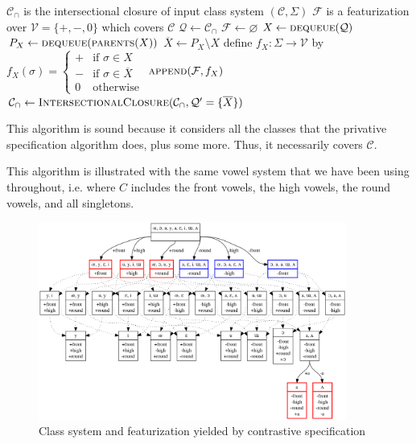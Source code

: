 \documentclass[11pt, oneside]{article}   	%
\begin{document}
\vspace{\baselineskip} \noindent \begin{algorithmic}
    \REQUIRE $\mathcal C_\cap$ is the intersectional closure of input class system $(\mathcal C, \Sigma)$
    \ENSURE $\mathcal F$ is a featurization over $\mathcal V = \{ +, -, 0 \}$ which covers $\mathcal C$
    \STATE
    \STATE $\mathcal Q \leftarrow \mathcal C_\cap$
    \STATE $\mathcal F \leftarrow \varnothing$
    \STATE
        \STATE $X \leftarrow \textsc{dequeue}(\mathcal Q)$
            \STATE $P_X \leftarrow \textsc{dequeue}(\textsc{parents}(X))$
            \STATE $\overline{X} \leftarrow P_X \setminus X$
            \STATE define $f_X : \Sigma \rightarrow \mathcal V$ by $f_X (\sigma) = \begin{cases}
                    + & \text{if } \sigma \in X \\
                    - & \text{if } \sigma \in \overline{X} \\
                    0 & \text{otherwise}
                    \end{cases}$
            \STATE $\textsc{append}(\mathcal F, f_X)$
            \STATE
            \STATE $\mathcal C_\cap \leftarrow \textsc{IntersectionalClosure}(\mathcal C_\cap, \mathcal Q' = \{\overline{X}\})$
        \ENDIF
    \ENDWHILE
\end{algorithmic}

\vspace{\baselineskip} \noindent This algorithm is sound because it considers all the classes that the privative specification algorithm does, plus some more. Thus, it necessarily covers $\mathcal C$.

\vspace{\baselineskip} This algorithm is illustrated with the same vowel system that we have been using throughout, i.e. where $C$ includes the front vowels, the high vowels, the round vowels, and all singletons.

\begin{figure}[h]
\includegraphics[width=0.9\textwidth]{vowelHarmony_contrastive.png}
\caption{Class system and featurization yielded by contrastive specification}
\label{fig:contrastive}
\end{figure}
\end{document}
